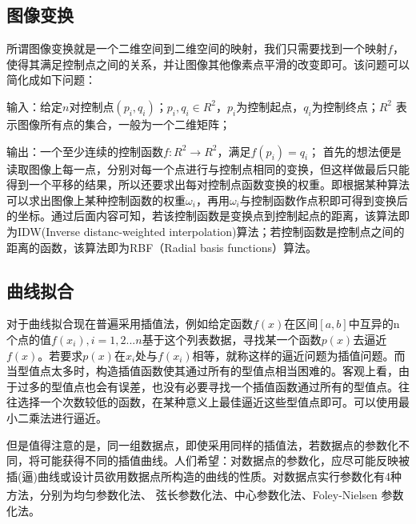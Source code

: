 \documentclass{article}
\newcommand{\upcite}[1]{\textsuperscript{\cite{#1}}}
\begin{document}
    \subsection{图像变换}
    所谓图像变换就是一个二维空间到二维空间的映射，我们只需要找到一个映射$f$，使得其满足控制点之间的关系，并让图像其他像素点平滑的改变即可。该问题可以简化成如下问题：
    
    输入：给定$n$对控制点$(p_i,q_i)$；$p_i,q_i\in R^2$，$p_i$为控制起点，$q_i$为控制终点；$R^2$ 表示图像所有点的集合，一般为一个二维矩阵；

    输出：一个至少连续的控制函数$f:R^2\rightarrow R^2$，满足$f(p_i)=q_i$；
    首先的想法便是读取图像上每一点，分别对每一个点进行与控制点相同的变换，但这样做最后只能得到一个平移的结果，所以还要求出每对控制点函数变换的权重。即根据某种算法可以求出图像上某种控制函数的权重$\omega_i$，再用$\omega_i$与控制函数作点积即可得到变换后的坐标。通过后面内容可知，若该控制函数是变换点到控制起点的距离，该算法即为IDW(Inverse distanc-weighted interpolation)算法；若控制函数是控制点之间的距离的函数，该算法即为RBF（Radial basis functions）算法。
    \subsection{曲线拟合}
    对于曲线拟合现在普遍采用插值法，例如给定函数$f(x)$在区间$[a,b]$中互异的n个点的值$f(x_i),i=1,2...n$基于这个列表数据，寻找某一个函数$p(x)$去逼近$f(x)$。若要求$p(x)$在$x_i$处与$f(x_i)$相等，就称这样的逼近问题为插值问题。而当型值点太多时，构造插值函数使其通过所有的型值点相当困难的。客观上看，由于过多的型值点也会有误差，也没有必要寻找一个插值函数通过所有的型值点。往往选择一个次数较低的函数，在某种意义上最佳逼近这些型值点即可。可以使用最小二乘法进行逼近。
    
    但是值得注意的是，同一组数据点，即使采用同样的插值法，若数据点的参数化不同，将可能获得不同的插值曲线。人们希望：对数据点的参数化，应尽可能反映被插(逼)曲线或设计员欲用数据点所构造的曲线的性质。对数据点实行参数化有4种方法\upcite{3}，分别为均匀参数化法、 弦长参数化法、中心参数化法、Foley-Nielsen 参数化法。
    \clearpage

    
 \setcounter{section}{4}
\end{document}
